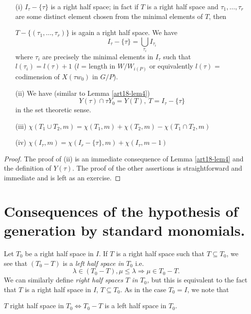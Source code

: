 \begin{lem}\label{art18-lem6}
\begin{itemize}
\item[(i)] $I_\tau - \{\tau\}$ is a right half space; in fact if $T$ is a right half space and $\tau_1, \ldots, \tau_r$ are some distinct element chosen from the minimal elements of $T$, then

$T - \{(\tau_1, \ldots, \tau_r)\}$ is again a right half space. We have 
$$
I_\tau - \{\tau\} =\bigcup\limits_{\tau_i} I_{\tau_i}
$$
where $\tau_i$ are precisely the minimal elements in $I_\tau$ such that $l(\tau_i) = l(\tau) +1$ ($l$ = length in $W/W_{i(P)}$ or equivalently $l(\tau)$ = codimension of $X(\tau w_0)$ in $G/P$).

\item[(ii)] We have (similar to Lemma \ref{art18-lem4})
$$
Y (\tau) \cap \tau Y_0 = Y(T), ~ T = I_\tau - \{\tau\}
$$
in the set theoretic sense.

\item[(iii)] $\chi (T_1 \cup T_2, m) = \chi(T_1, m) + \chi (T_2,m) - \chi (T_1 \cap T_2, m )$

\item[(iv)] $\chi (I_\tau , m) = \chi (I_r - \{\tau\}, m) + \chi (I_\tau, m -1)$

\end{itemize}
\end{lem}

\begin{proof}
The proof of (ii) is an immediate consequence of Lemma \ref{art18-lem4} and the definition of $Y(\tau)$. The proof of the other assertions is straightforward and immediate and is left as an exercise.
\end{proof}

\section{Consequences of the hypothesis of generation by standard monomials.}\label{art18-sec4}
Let $T_0$ be a right half space in $I$. If $T$ is a right half space such that $T \subseteq T_0$, we see that $(T_0 - T)$ is a  {\em left half space in $T_0$} i.e.
$$
\lambda \in (T_0 - T), \mu \leqslant \lambda \Rightarrow \mu \in T_0 - T.
$$
We can similarly define {\em right half spaces $T$ in $T_0$,} but this is equivalent to the fact that $T$ is a right half space in $I$, $T \subseteq T_0$. As in the case $T_0 =I$, we note that  

$T$ right half space in $T_0 \Leftrightarrow T_0 - T$ is a left half space in $T_0.$

